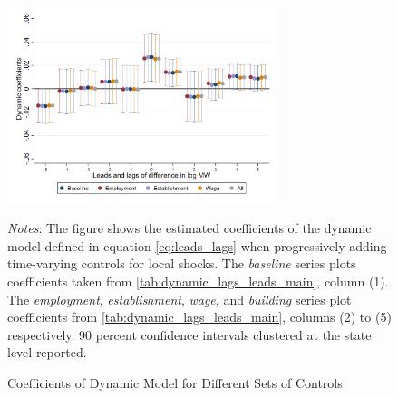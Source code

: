 \clearpage
\begin{figure}[!h]
	\caption{Coefficients of Dynamic Model for Different Sets of Controls}
	\label{fig:}
	\centering
	\includegraphics[width = 0.7\textwidth]{../../analysis/first_differences/output/fd_models_control.png}
	\begin{minipage}{.95\textwidth} \footnotesize
		\vspace{2mm} 
		\textit{Notes}: The figure shows the estimated coefficients of the dynamic model defined 
		in 	equation \autoref{eq:leads_lags} when progressively adding time-varying controls for 
		local shocks. The \textit{baseline} series plots coefficients taken from 
		\autoref{tab:dynamic_lags_leads_main}, column (1). The \textit{employment}, 
		\textit{establishment}, \textit{wage}, and \textit{building} series plot coefficients 
		from \autoref{tab:dynamic_lags_leads_main}, columns (2) to (5) respectively.
		90 percent confidence intervals clustered at the state level reported.
	\end{minipage}
\end{figure}

